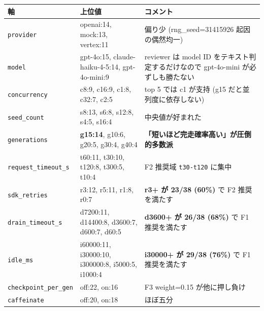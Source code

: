 \documentclass[
]{ltjsarticle}
\newcounter{none} %
\begin{document}
{\def\LTcaptype{none} %
\begin{longtable}[]{@{}
  >{\raggedright\arraybackslash}p{}
  >{\raggedright\arraybackslash}p{}
  >{\raggedright\arraybackslash}p{}@{}}
\toprule\noalign{}
\begin{minipage}[b]{\linewidth}\raggedright
軸
\end{minipage} & \begin{minipage}[b]{\linewidth}\raggedright
上位値
\end{minipage} & \begin{minipage}[b]{\linewidth}\raggedright
コメント
\end{minipage} \\
\midrule\noalign{}
\endhead
\bottomrule\noalign{}
\endlastfoot
\texttt{provider} & openai:14, mock:13, vertex:11 & 偏り少
(rng\_seed=31415926 起因の偶然均一) \\
\texttt{model} & gpt-4o:15, claude-haiku-4-5:14, gpt-4o-mini:9 &
reviewer は model ID をテキスト判定するだけなので gpt-4o-mini
が必ずしも勝たない \\
\texttt{concurrency} & c8:9, c16:9, c1:8, c32:7, c2:5 & top 5 では c1
が支持 (g15 だと並列度に依存しない) \\
\texttt{seed\_count} & s8:13, s6:8, s12:8, s4:5, s16:4 &
中央値が好まれた \\
\texttt{generations} & \textbf{g15:14}, g10:6, g20:5, g30:4, g40:4 &
\textbf{「短いほど完走確率高い」が圧倒的多数派} \\
\texttt{request\_timeout\_s} & t60:11, t30:10, t120:8, t300:5, t10:4 &
F2 推奨域 \texttt{t30-t120} に集中 \\
\texttt{sdk\_retries} & r3:12, r5:11, r1:8, r0:7 & \textbf{r3+ が 23/38
(60\%)} で F2 推奨を満たす \\
\texttt{drain\_timeout\_s} & d7200:11, d14400:8, d3600:7, d600:7, d60:5
& \textbf{d3600+ が 26/38 (68\%)} で F1 推奨を満たす \\
\texttt{idle\_ms} & i60000:11, i30000:10, i300000:8, i5000:5, i1000:4 &
\textbf{i30000+ が 29/38 (76\%)} で F1 推奨を満たす \\
\texttt{checkpoint\_per\_gen} & off:22, on:16 & F3 weight=0.15
が他に押し負け \\
\texttt{caffeinate} & off:20, on:18 & ほぼ五分 \\
\end{longtable}
}
\end{document}
